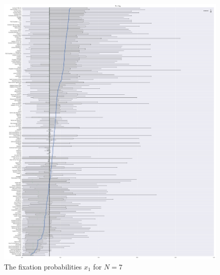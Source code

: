 \documentclass{article}
\begin{document}
\begin{figure}[!hbtp]
    \centering
    \includegraphics[height=.9\textheight]{./img/boxplot_7_invade.pdf}
    \caption{The fixation probabilities \(x_1\) for \(N=7\)}
    \label{fig:boxplot_7_invade}
\end{figure}
\end{document}
